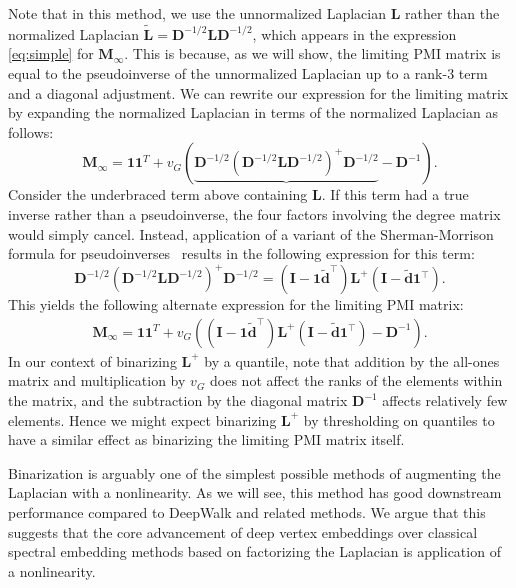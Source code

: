 \documentclass[sigconf]{acmart}
\newcommand{\mbf}[1]{\mathbf{#1}}
\newcommand{\bv}[1]{\mathbf{#1}}
\begin{document}
Note that in this method, we use the unnormalized Laplacian $\mbf{L}$ rather than the normalized Laplacian $\mbf{\tilde{L}} = \mbf{D}^{-1/2} \mbf{L} \mbf{D}^{-1/2}$, which appears in the expression \eqref{eq:simple} for $\bv{M_\infty}$. This is because, as we will show, 
%
the limiting PMI matrix is equal to the pseudoinverse of the unnormalized Laplacian up to a rank-3 term and a diagonal adjustment. We can rewrite our expression for the limiting matrix by expanding the normalized Laplacian in terms of the normalized Laplacian as follows:
%
\[ \mbf{M_\infty} = \mbf{1}\mbf{1}^T + v_G \left( \underbrace{\mbf{D}^{-1/2} \left(\mbf{D}^{-1/2} \mbf{L} \mbf{D}^{-1/2} \right)^+  \mbf{D}^{-1/2}} - \mbf{D}^{-1} \right) . \]
%
Consider the underbraced term above containing $\mbf{L}$. If this term had a true inverse rather than a pseudoinverse, the four factors involving the degree matrix would simply cancel. Instead, application of a variant of the Sherman-Morrison formula for pseudoinverses~\cite{meyer1973generalized} results in the following expression for this term:
%
\[ \mbf{D}^{-1/2} \left(\mbf{D}^{-1/2} \mbf{L} \mbf{D}^{-1/2} \right)^+  \mbf{D}^{-1/2} = (\mbf{I} - \mbf{1} \bm{\tilde{d}}^\top) \mbf{L}^+ (\mbf{I} - \bm{\tilde{d}} \mbf{1}^\top) .\]
%
This yields the following alternate expression for the limiting PMI matrix:
%
\begin{align}\label{eq:rank3} \mbf{M_\infty} = \mbf{1}\mbf{1}^T + v_G \left( (\mbf{I} - \mbf{1} \bm{\tilde{d}}^\top) \mbf{L}^+ (\mbf{I} - \bm{\tilde{d}} \mbf{1}^\top) - \mbf{D}^{-1} \right) .
\end{align}
%
In our context of binarizing $\mbf{L}^+$ by a quantile, note that addition by the all-ones matrix and multiplication by $v_G$ does not affect the ranks of the elements within the matrix, and the subtraction by the diagonal matrix $\mbf{D}^{-1}$ affects relatively few elements. Hence we might expect binarizing $\mbf{L}^+$ by thresholding on quantiles to have a similar effect as binarizing the limiting PMI matrix itself.

Binarization is arguably one of the simplest possible methods of augmenting the Laplacian with a nonlinearity. As we will see, this method has good downstream performance compared to DeepWalk and related methods. We argue that this suggests that the core advancement of deep vertex embeddings over classical spectral embedding methods based on factorizing the Laplacian is application of a nonlinearity.
\end{document}
